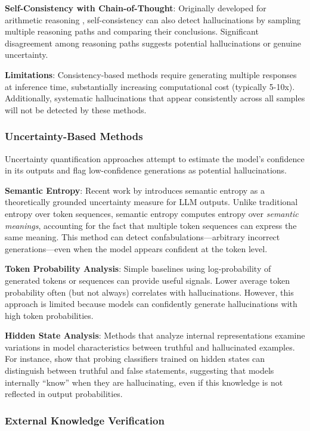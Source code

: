 \textbf{Self-Consistency with Chain-of-Thought}: Originally developed for arithmetic reasoning \citep{wang2023selfconsistency}, self-consistency can also detect hallucinations by sampling multiple reasoning paths and comparing their conclusions. Significant disagreement among reasoning paths suggests potential hallucinations or genuine uncertainty.

\textbf{Limitations}: Consistency-based methods require generating multiple responses at inference time, substantially increasing computational cost (typically 5-10x). Additionally, systematic hallucinations that appear consistently across all samples will not be detected by these methods.

\subsubsection{Uncertainty-Based Methods}

Uncertainty quantification approaches attempt to estimate the model's confidence in its outputs and flag low-confidence generations as potential hallucinations.

\textbf{Semantic Entropy}: Recent work by \citet{farquhar2024semantic} introduces semantic entropy as a theoretically grounded uncertainty measure for LLM outputs. Unlike traditional entropy over token sequences, semantic entropy computes entropy over \textit{semantic meanings}, accounting for the fact that multiple token sequences can express the same meaning. This method can detect confabulations—arbitrary incorrect generations—even when the model appears confident at the token level.

\textbf{Token Probability Analysis}: Simple baselines using log-probability of generated tokens or sequences can provide useful signals. Lower average token probability often (but not always) correlates with hallucinations. However, this approach is limited because models can confidently generate hallucinations with high token probabilities.

\textbf{Hidden State Analysis}: Methods that analyze internal representations examine variations in model characteristics between truthful and hallucinated examples. For instance, \citet{azaria2023internal} show that probing classifiers trained on hidden states can distinguish between truthful and false statements, suggesting that models internally ``know'' when they are hallucinating, even if this knowledge is not reflected in output probabilities.

\subsubsection{External Knowledge Verification}

